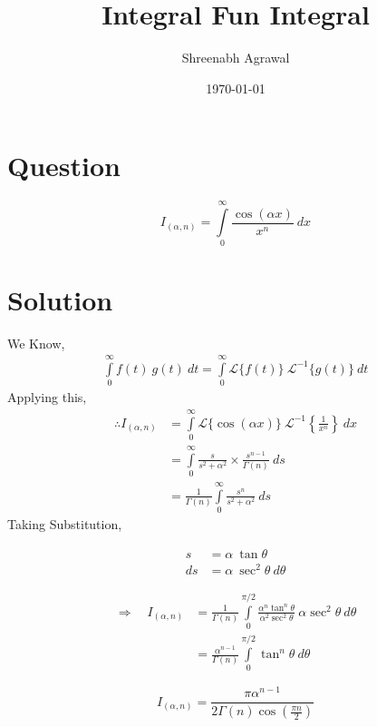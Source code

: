 \documentclass{article}
\title{Integral Fun Integral}
\author{Shreenabh Agrawal }
\date{\today}
\begin{document}
\maketitle

\section{Question}

$$I_{(\alpha, n)}=\int\limits_{0}^{\infty} \frac{\cos (\alpha x)}{x^{n}} \: d x$$

\section{Solution}
We Know,
$$\begin{aligned}
\int\limits_{0}^{\infty} f(t) \: g(t) \: d t=\int\limits_{0}^{\infty} \mathcal{L}\{f(t)\} \: \mathcal{L}^{-1}\{g(t)\} \: d t
\end{aligned}$$
Applying this,
$$\begin{aligned}
\therefore I_{(\alpha, n)} &=\int\limits_{0}^{\infty} \mathcal{L}\{\cos (\alpha x)\} \: \mathcal{L}^{-1}\left\{\frac{1}{x^{n}}\right\} \: d x \\
&=\int\limits_{0}^{\infty} \frac{s}{s^{2}+\alpha^{2}} \times \frac{s^{n-1}}{\Gamma(n)} \: d s \\
&=\frac{1}{\Gamma(n)} \int\limits_{0}^{\infty} \frac{s^{n}}{s^{2}+\alpha^{2}} \: d s
\end{aligned}$$
Taking Substitution,

$$\begin{aligned}
s&= \alpha \: \tan \theta \\
d s &=\alpha \: \sec ^{2} \theta \: d \theta
\end{aligned}$$

$$\begin{aligned} \Rightarrow \quad I_{(\alpha, n)} &=\frac{1}{\Gamma(n)} \int\limits_{0}^{\pi / 2} \frac{\alpha^{n} \tan ^{n} \theta}{\alpha^{2} \sec ^{2} \theta} \: \alpha \sec^{2} \theta \: d \theta \\ &=\frac{\alpha^{n-1}}{\Gamma(n)} \int\limits_{0}^{\pi / 2} \tan ^{n} \theta \: d \theta \end{aligned}$$

$$\boxed{I_{(\alpha, n)}=\frac{\pi \alpha^{n-1}}{2 \Gamma(n) \cos \left(\frac{\pi n}{2}\right)}}$$
\end{document}
